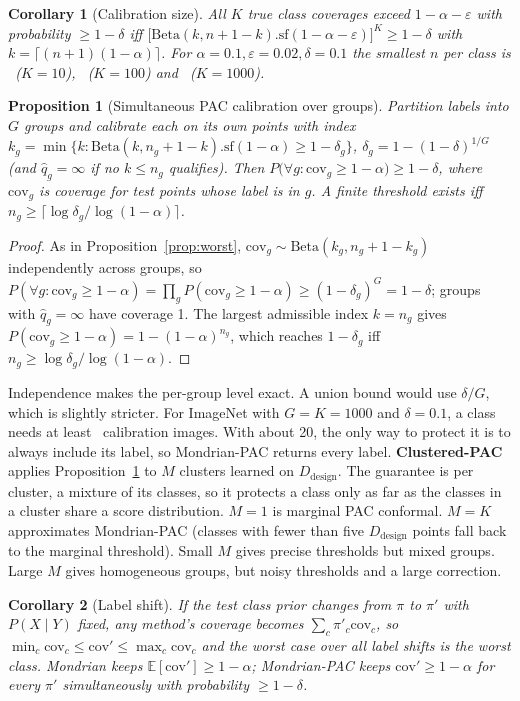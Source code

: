 \documentclass{article}
\newtheorem{proposition}{Proposition}
\newtheorem{corollary}{Corollary}
\newcommand{\ddes}{D_\text{design}}
\newcommand{\cov}{\mathrm{cov}}
\begin{document}
\begin{corollary}[Calibration size]\label{cor:n}
All $K$ true class coverages exceed $1-\alpha-\varepsilon$ with probability $\ge1-\delta$ iff
$\big[\mathrm{Beta}(k,n+1-k).\mathrm{sf}(1-\alpha-\varepsilon)\big]^K\ge1-\delta$ with $k=\lceil(n+1)(1-\alpha)\rceil$. For
$\alpha=0.1,\varepsilon=0.02,\delta=0.1$ the smallest $n$ per class is \NeedTen\ ($K{=}10$), \NeedHun\ ($K{=}100$) and \NeedThou\ ($K{=}1000$).
\end{corollary}

\begin{proposition}[Simultaneous PAC calibration over groups]\label{prop:pac}
Partition labels into $G$ groups and calibrate each on its own points with index
$k_g=\min\{k:\mathrm{Beta}(k,n_g+1-k).\mathrm{sf}(1-\alpha)\ge1-\delta_g\}$, $\delta_g=1-(1-\delta)^{1/G}$ (and $\hat q_g=\infty$ if no
$k\le n_g$ qualifies). Then $P\big(\forall g:\cov_g\ge1-\alpha\big)\ge1-\delta$, where $\cov_g$ is coverage for test points whose
label is in $g$. A finite threshold exists iff $n_g\ge\lceil\log\delta_g/\log(1-\alpha)\rceil$.
\end{proposition}
\begin{proof}
As in Proposition~\ref{prop:worst}, $\cov_g\sim\mathrm{Beta}(k_g,n_g+1-k_g)$ independently across groups, so
$P(\forall g:\cov_g\ge1-\alpha)=\prod_g P(\cov_g\ge1-\alpha)\ge(1-\delta_g)^G=1-\delta$; groups with $\hat q_g=\infty$ have coverage 1.
The largest admissible index $k=n_g$ gives $P(\cov_g\ge1-\alpha)=1-(1-\alpha)^{n_g}$, which reaches $1-\delta_g$ iff
$n_g\ge\log\delta_g/\log(1-\alpha)$.
\end{proof}
Independence makes the per-group level exact. A union bound would use $\delta/G$, which is slightly stricter. For ImageNet with
$G=K=1000$ and $\delta=0.1$, a class needs at least \PacMinINet\ calibration images. With about 20, the only way to protect it is to
always include its label, so Mondrian-PAC returns every label. \textbf{Clustered-PAC} applies Proposition~\ref{prop:pac} to $M$
clusters learned on $\ddes$. The guarantee is per cluster, a mixture of its classes, so it protects a class only as far as the classes
in a cluster share a score distribution. $M=1$ is marginal PAC conformal. $M=K$ approximates Mondrian-PAC (classes with fewer than
five $\ddes$ points fall back to the marginal threshold). Small $M$ gives precise thresholds but mixed groups. Large $M$ gives
homogeneous groups, but noisy thresholds and a large correction.

\begin{corollary}[Label shift]\label{cor:shift}
If the test class prior changes from $\pi$ to $\pi'$ with $P(X\mid Y)$ fixed, any method's coverage becomes $\sum_c\pi'_c\cov_c$,
so $\min_c\cov_c\le\cov'\le\max_c\cov_c$ and the worst case over all label shifts is the worst class. Mondrian keeps
$\mathbb E[\cov']\ge1-\alpha$; Mondrian-PAC keeps $\cov'\ge1-\alpha$ for every $\pi'$ simultaneously with probability $\ge1-\delta$.
\end{corollary}
\end{document}
